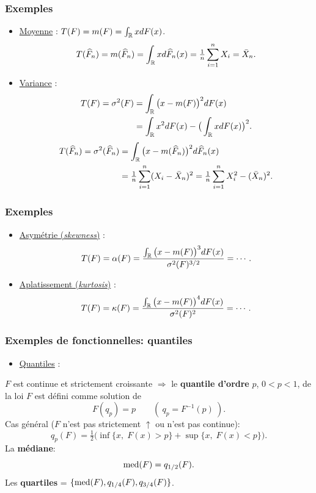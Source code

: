 \begin{frame}
\frametitle{Exemples}
\begin{itemize}
\item \underline{Moyenne} : $T(F)=m(F) = \int_{\operatorname{{\mathbb R}}}xdF(x)$.
$$
T(\widehat F_n)=m(\widehat F_n)=\int _{\operatorname{{\mathbb R}}}xd\widehat F_n(x)=
\tfrac{1}{n}\sum_{i = 1}^n X_i  = \bar X_n.
$$
\item \underline{Variance} :
\begin{align*}
T(F)=\sigma^2(F) & = \int_{\operatorname{{\mathbb R}}}\big(x-m(F)\big)^2dF(x)\\
& = \int_{\operatorname{{\mathbb R}}}x^2 dF(x)-\big(\int_{\operatorname{{\mathbb R}}}xdF(x)\big)^2.
\end{align*}
\begin{align*}
T(\widehat F_n)=\sigma^2(\widehat F_n) & =
\int_{\operatorname{{\mathbb R}}}\big(x-m(\widehat F_n)\big)^2d\widehat F_n(x) \\
& = \tfrac{1}{n}\sum_{i = 1}^n (X_i-\bar X_n)^2= \tfrac{1}{n}\sum_{i
= 1}^n X_i^2-(\bar X_n)^2.
\end{align*}
\end{itemize}
\end{frame}

\begin{frame}
\frametitle{Exemples}
\begin{itemize}
\item \underline{Asymétrie ({\it skewness})} :
$$T(F)=\alpha(F)=\frac{\int_{\operatorname{{\mathbb R}}}\big(x-m(F)\big)^3dF(x)}{\sigma^2(F)^{3/2}}=\cdots.$$
\item \underline{Aplatissement ({\it kurtosis})} :
$$T(F)=\kappa(F) = \frac{\int_{\operatorname{{\mathbb R}}}\big(x-m(F)\big)^4dF(x)}{\sigma^2(F)^2}=\cdots.$$
\end{itemize}
\end{frame}


\begin{frame}
\frametitle{Exemples de fonctionnelles: quantiles}
\begin{itemize}
\item \underline{Quantiles} :
\end{itemize}
$F$ est \alert{continue et strictement croissante}
$\Longrightarrow$ le {\bf quantile d'ordre} $p$, $0 < p < 1$, de la
loi $F$ est d\'efini comme solution de
$$
F(q_p) = p \quad \quad ( \ q_p=F^{-1}(p) \ ).
$$
\alert{Cas g\'en\'eral} ($F$ n'est pas strictement $\uparrow$
ou n'est pas continue):
$$
q_p(F) = \tfrac{1}{2}\big(\inf\{x,\;F(x)>p\}+\sup\{x,\;F(x) <
p\}\big).
$$
La {\bf médiane}:
$${\rm med}(F)=q_{1/2}(F).$$
Les {\bf quartiles} = $\{{\rm med}(F), q_{1/4}(F), q_{3/4}(F)\}$.
\end{frame}

